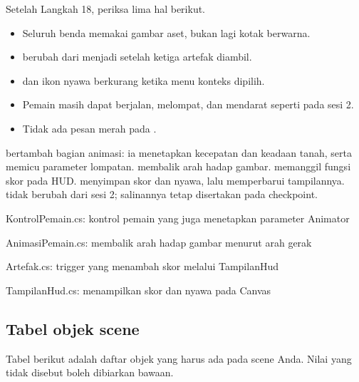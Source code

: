 \begin{ujibox}
Setelah Langkah 18, periksa lima hal berikut.
\begin{itemize}[leftmargin=1.4em, itemsep=0.2em]
  \item Seluruh benda memakai gambar aset, bukan lagi kotak berwarna.
  \item {} berubah dari  menjadi
         setelah ketiga artefak diambil.
  \item {} dan ikon nyawa berkurang ketika menu konteks
         dipilih.
  \item Pemain masih dapat berjalan, melompat, dan mendarat seperti pada
        sesi 2.
  \item Tidak ada pesan merah pada .
\end{itemize}
\end{ujibox}


 bertambah bagian animasi: ia menetapkan kecepatan dan
keadaan tanah, serta memicu parameter lompatan. 
membalik arah hadap gambar.  memanggil fungsi skor pada HUD.
 menyimpan skor dan nyawa, lalu memperbarui tampilannya.
 tidak berubah dari sesi 2; salinannya tetap disertakan pada
checkpoint.

  {KontrolPemain.cs: kontrol pemain yang juga menetapkan parameter Animator}

  {AnimasiPemain.cs: membalik arah hadap gambar menurut arah gerak}

  {Artefak.cs: trigger yang menambah skor melalui TampilanHud}

  {TampilanHud.cs: menampilkan skor dan nyawa pada Canvas}

\subsection*{Tabel objek scene}

Tabel berikut adalah daftar objek yang harus ada pada scene Anda. Nilai yang
tidak disebut boleh dibiarkan bawaan.

